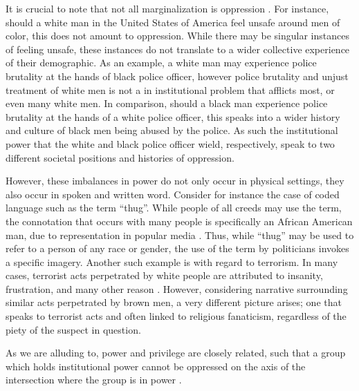 It is crucial to note that not all marginalization is oppression \citep{Abberley:1987}. For instance, should a white man in the United States of America feel unsafe around men of color, this does not amount to oppression. While there may be singular instances of feeling unsafe, these instances do not translate to a wider collective experience of their demographic. As an example, a white man may experience police brutality at the hands of black police officer, however police brutality and unjust treatment of white men is not a in institutional problem that afflicts most, or even many white men. In comparison, should a black man experience police brutality at the hands of a white police officer, this speaks into a wider history and culture of black men being abused by the police. As such the institutional power that the white and black police officer wield, respectively, speak to two different societal positions and histories of oppression. 

However, these imbalances in power do not only occur in physical settings, they also occur in spoken and written word. Consider for instance the case of coded language such as the term ``thug''. While people of all creeds may use the term, the connotation that occurs with many people is specifically an African American man, due to representation in popular media \citep{Dixon:2006}. Thus, while ``thug'' may be used to refer to a person of any race or gender, the use of the term by politicians invokes a specific imagery. 
Another such example is with regard to terrorism. In many cases, terrorist acts perpetrated by white people are attributed to insanity, frustration, and many other reason \citep{Powell:2011}. However, considering narrative surrounding similar acts perpetrated by brown men, a very different picture arises; one that speaks to terrorist acts and often linked to religious fanaticism, regardless of the piety of the suspect in question.

As we are alluding to, power and privilege are closely related, such that a group which holds institutional power cannot be oppressed on the axis of the intersection where the group is in power \citep{Eisenstein:1977}. 

